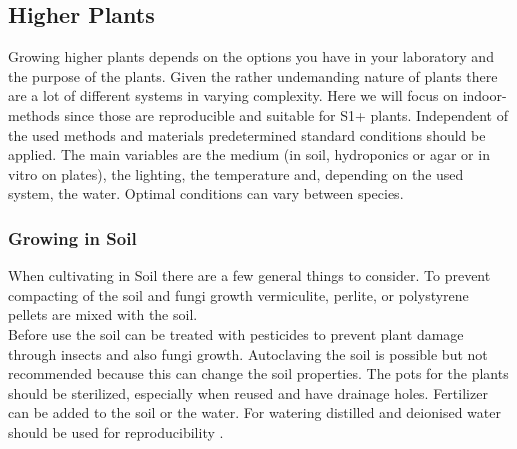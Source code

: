 \subsection{Higher Plants}
Growing higher plants depends on the options you have in your laboratory and the purpose of the plants. Given the rather undemanding nature of plants there are a lot of different systems in varying complexity. Here we will focus on indoor-methods since those are reproducible and suitable for S1+ plants. Independent of the used methods and materials predetermined standard conditions should be applied.
\newline\newline
The main variables are the medium (in soil, hydroponics or agar or in vitro on plates), the lighting, the temperature and, depending on the used system, the water. Optimal conditions can vary between species. 
\subsubsection{Growing in Soil}
When cultivating in Soil there are a few general things to consider. To prevent compacting of the soil and fungi growth vermiculite, perlite, or polystyrene pellets are mixed with the soil. \\
Before use the soil can be treated with pesticides to prevent plant damage through insects and also fungi growth. Autoclaving the soil is possible but not recommended because this can change the soil properties. The pots for the plants should be sterilized, especially when reused and have drainage holes.
Fertilizer can be added to the soil or the water. For watering distilled and deionised water should be used for reproducibility \parencite{Podar2012}.


